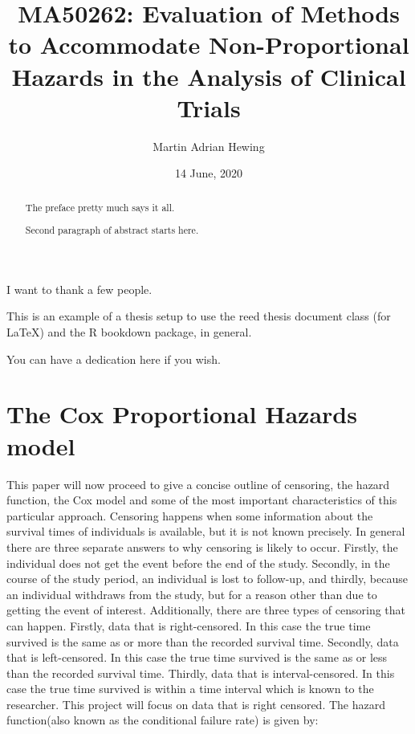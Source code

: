 \documentclass[12pt,twoside]{reedthesis}
\title{MA50262: Evaluation of Methods to Accommodate Non-Proportional Hazards in the Analysis of Clinical Trials}
\author{Martin Adrian Hewing}
\date{14 June, 2020}
\begin{document}
  \maketitle

\frontmatter %
\pagestyle{empty} %
  \begin{acknowledgements}
    I want to thank a few people.
  \end{acknowledgements}
  \begin{preface}
    This is an example of a thesis setup to use the reed thesis document class
    (for LaTeX) and the R bookdown package, in general.
  \end{preface}
  \hypersetup{linkcolor=black}
  \setcounter{tocdepth}{2}
  \tableofcontents

  \listoftables

  \listoffigures
  \begin{abstract}
    The preface pretty much says it all.
    
    \par
    
    Second paragraph of abstract starts here.
  \end{abstract}
  \begin{dedication}
    You can have a dedication here if you wish.
  \end{dedication}
\mainmatter %
\pagestyle{fancyplain} %

\hypertarget{the-cox-proportional-hazards-model}{%
\chapter*{The Cox Proportional Hazards model}\label{the-cox-proportional-hazards-model}}

This paper will now proceed to give a concise outline of censoring, the hazard function, the Cox model and some of the most important characteristics of this particular approach.
Censoring happens when some information about the survival times of individuals is available, but it is not known precisely. In general there are three separate answers to why censoring is likely to occur. Firstly, the individual does not get the event before the end of the study. Secondly, in the course of the study period, an individual is lost to follow-up, and thirdly, because an individual withdraws from the study, but for a reason other than due to getting the event of interest.
Additionally, there are three types of censoring that can happen. Firstly, data that is right-censored. In this case the true time survived is the same as or more than the recorded survival time. Secondly, data that is left-censored. In this case the true time survived is the same as or less than the recorded survival time. Thirdly, data that is interval-censored. In this case the true time survived is within a time interval which is known to the researcher. This project will focus on data that is right censored.
The hazard function(also known as the conditional failure rate) is given by:
\end{document}
